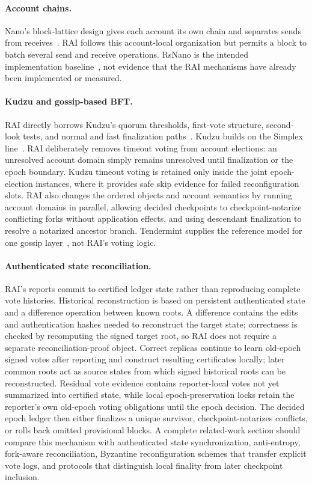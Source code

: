 \documentclass[10pt,twocolumn]{article}
\begin{document}
\paragraph{Account chains.} Nano's block-lattice design gives each account its own chain and separates sends from receives~\cite{Nano}. RAI follows this account-local organization but permits a block to batch several send and receive operations. RsNano is the intended implementation baseline~\cite{RsNano}, not evidence that the RAI mechanisms have already been implemented or measured.

\paragraph{Kudzu and gossip-based BFT.} RAI directly borrows Kudzu's quorum thresholds, first-vote structure, second-look tests, and normal and fast finalization paths~\cite{Kudzu}. Kudzu builds on the Simplex line~\cite{Simplex}. RAI deliberately removes timeout voting from account elections: an unresolved account domain simply remains unresolved until finalization or the epoch boundary. Kudzu timeout voting is retained only inside the joint epoch-election instances, where it provides safe skip evidence for failed reconfiguration slots. RAI also changes the ordered objects and account semantics by running account domains in parallel, allowing decided checkpoints to checkpoint-notarize conflicting forks without application effects, and using descendant finalization to resolve a notarized ancestor branch. Tendermint supplies the reference model for one gossip layer~\cite{Tendermint}, not RAI's voting logic.

\paragraph{Authenticated state reconciliation.} RAI's reports commit to certified ledger state rather than reproducing complete vote histories. Historical reconstruction is based on persistent authenticated state and a difference operation between known roots. A difference contains the edits and authentication hashes needed to reconstruct the target state; correctness is checked by recomputing the signed target root, so RAI does not require a separate reconciliation-proof object. Correct replicas continue to learn old-epoch signed votes after reporting and construct resulting certificates locally; later common roots act as source states from which signed historical roots can be reconstructed. Residual vote evidence contains reporter-local votes not yet summarized into certified state, while local epoch-preservation locks retain the reporter's own old-epoch voting obligations until the epoch decision. The decided epoch ledger then either finalizes a unique survivor, checkpoint-notarizes conflicts, or rolls back omitted provisional blocks. A complete related-work section should compare this mechanism with authenticated state synchronization, anti-entropy, fork-aware reconciliation, Byzantine reconfiguration schemes that transfer explicit vote logs, and protocols that distinguish local finality from later checkpoint inclusion.
\end{document}
